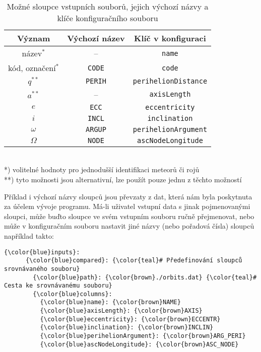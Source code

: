 \begin{table}[ht]
    \centering
    \caption[Možné sloupce vstupních souborů a jejich výchozí názvy]{Možné sloupce vstupních souborů, jejich výchozí názvy a klíče konfiguračního souboru}
    \begin{tabular}{|ccc|}
        \hline
        \textbf{Význam}   & \textbf{Výchozí název} & \textbf{Klíč v konfiguraci} \\
        \hline
        název$^*$         & --                     & \texttt{name}               \\
        kód, označení$^*$ & \texttt{CODE}          & \texttt{code}               \\
        $q^{**}$          & \texttt{PERIH}         & \texttt{perihelionDistance} \\
        $a^{**}$          & --                     & \texttt{axisLength}         \\
        $e$               & \texttt{ECC}           & \texttt{eccentricity}       \\
        $i$               & \texttt{INCL}          & \texttt{inclination}        \\
        $\omega$          & \texttt{ARGUP}         & \texttt{perihelionArgument} \\
        $\Omega$          & \texttt{NODE}          & \texttt{ascNodeLongitude}   \\
        \hline
    \end{tabular}
    {\footnotesize\\
    *) volitelné hodnoty pro jednodušší identifikaci meteorů či rojů\\
    **) tyto možnosti jsou alternativní, lze použít pouze jednu z těchto možností
    }
    \label{tbl:practical:columns}
\end{table}

Příklad i výchozí názvy sloupců jsou převzaty z dat, která nám byla poskytnuta za účelem vývoje programu. Má-li uživatel vstupní data s jinak pojmenovanými sloupci, může buďto sloupce ve svém vstupním souboru ručně přejmenovat, nebo může v konfiguračním souboru nastavit jiné názvy (nebo pořadová čísla) sloupců například takto:
\begin{Verbatim}[commandchars=\\\{\},gobble=4,formatcom=\footnotesize,codes={\catcode`$=3\catcode`^=7},frame=lines]
    {\color{blue}inputs}:
      {\color{blue}compared}: {\color{teal}# Předefinování sloupců srovnávaného souboru}
        {\color{blue}path}: {\color{brown}./orbits.dat} {\color{teal}# Cesta ke srovnávanému souboru}
        {\color{blue}columns}:
          {\color{blue}name}: {\color{brown}NAME}
          {\color{blue}axisLength}: {\color{brown}AXIS}
          {\color{blue}eccentricity}: {\color{brown}ECCENTR}
          {\color{blue}inclination}: {\color{brown}INCLIN}
          {\color{blue}perihelionArgument}: {\color{brown}ARG_PERI}
          {\color{blue}ascNodeLongitude}: {\color{brown}ASC_NODE}
\end{Verbatim}

